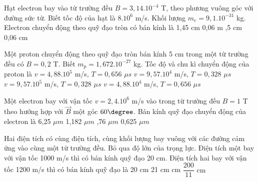 \begin{vidu} %
Hạt electron bay vào từ trường đều $B = 3,14. 10^{-4}$ T, theo phương vuông góc với đường sức từ. Biết tốc độ của hạt là $8. 10^6$ m/s. Khối lượng $m_e = 9,1. 10^{-31}$ kg.  Electron chuyển động theo quỹ đạo tròn có bán kính là
\choice
{1,45 cm}
{0,06 m}
{,5 cm}
{0,06 cm}
\end{vidu}
\begin{vidu} %
	Một proton chuyển động theo quỹ đạo tròn bán kính 5 cm trong một từ trường đều có $B = 0,2$ T. Biết $m_p = 1,672. 10^{-27}$ kg. Tốc độ và chu kì chuyển động của proton là
	\choice
	{$v = 4,88. 10^5$ m/s, $T = 0,656$ $\mu s$}
	{$v = 9,57. 10^4$ m/s, $T = 0,328$ $\mu s$}
	{\True $v = 9,57. 10^5$ m/s, $T = 0,328$ $\mu s$}
	{$v = 4,88. 10^4$ m/s, $T = 0,656$ $\mu s$}
\end{vidu}
\begin{vidu} %
	Một electron bay với vận tốc $v = 2,4.10^6$ m/s vào trong từ trường đều $B = 1$ T theo hướng hợp với $\vec{B}$ một góc $60\degree$. Bán kính quỹ đạo chuyển động của electron là
	\choice
	{6,25 $\mu m$}
	{1,182 $\mu m$}
	{,76 $\mu m$}
	{0,625 $\mu m$}
\end{vidu}
\begin{vidu} %
	Hai điện tích có cùng điện tích, cùng khối lượng bay vuông với các đường cảm ứng vào cùng một từ trường đều. Bỏ qua độ lớn của trọng lực. Điện tích một bay với vận tốc 1000 m/s thì có bán kính quỹ đạo 20 cm. Điện tích hai bay với vận tốc 1200 m/s thì có bán kính quỹ đạo là
	\choice
	{20 cm}
	{21 cm}
	{ cm}
	{$\dfrac{200}{11}$ cm}
\end{vidu}
